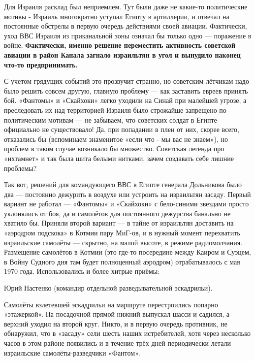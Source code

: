 Для Израиля расклад был неприемлем. Тут были даже не какие-то политические мотивы - Израиль многократно уступал Египту в артиллерии, и отвечал на постоянные обстрелы в первую очередь действиями своей авиации. Фактически, уход ВВС Израиля из приканальной зоны означал бы только одно — поражение в войне. \textbf{Фактически, именно решение переместить активность советской авиации в район Канала загнало израильтян в угол и вынудило наконец что-то предпринимать.}

С учетом грядущих событий это прозвучит странно, но советским лётчикам надо было решить совсем другую, главную проблему — как заставить евреев принять бой. «Фантомы» и «Скайхоки» легко уходили на Синай при малейшей угрозе, а преследовать их над территорией Израиля было строжайше запрещено по политическим мотивам — не забываем, что советских солдат в Египте официально не существовало! Да, при попадании в плен от них, скорее всего, отказались бы (вспоминаем знаменитое «если что - мы вас не знаем»), но проблем в таком случае возникало бы множество. Советская легенда про «ихтамнет» и так была шита белыми нитками, зачем создавать себе лишние проблемы?

Так вот, решений для командующего ВВС в Египте генерала Дольникова было два — постоянно дежурить в воздухе или устроить на израильтян засаду. Первый вариант не работал — «Фантомы» и «Скайхоки» с бело-синими звездами просто уклонялись от боя, да и самолётов для постоянного дежурства банально не хватило бы. Приняли второй вариант — в тайне от израильтян доставить на «аэродром подскока» в Котмии пару МиГ-ов, и в нужный момент перехватить израильские самолёты — скрытно, на малой высоте, в режиме радиомолчания. Размещение самолётов в Котмии (это где-то посередине между Каиром и Суэцем, в Войну Судного дня там будет полноценный аэродром) отрабатывалось с мая 1970 года. Использовались и более хитрые приёмы:

Юрий Настенко (командир отдельной разведывательной эскадрильи).

\begin{textcitation}
	Самолёты взлетевшей эскадрильи на маршруте перестроились попарно «этажеркой». На посадочной прямой нижний выпускал шасси и садился, а верхний уходил на второй круг. Никто, и в первую очередь противник, не обнаружил, что в «засаду» сели шесть наших истребителей, хотя через несколько часов в этом районе появились и в течение трёх дней периодически летали израильские самолёты-разведчики «Фантом». 
\end{textcitation}

